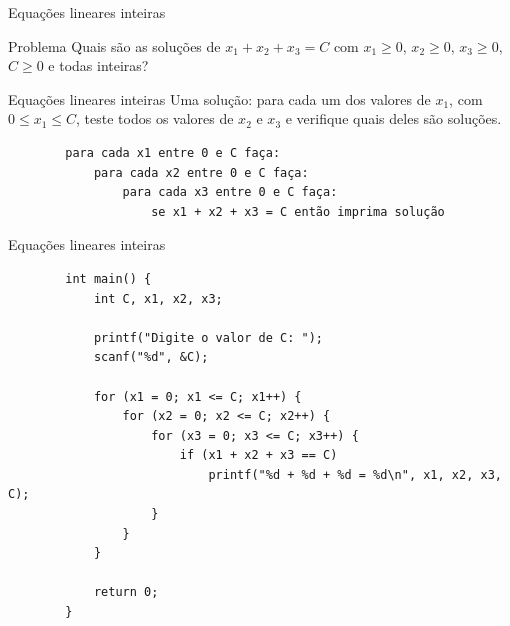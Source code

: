 \documentclass[handout]{beamer}
\begin{document}
\begin{frame}[fragile]{Equações lineares inteiras}
    \begin{block}{Problema}
        Quais são as soluções de $x_1 + x_2 + x_3 = C$ com $x_1 \geq 0$, $x_2 \geq 0$, $x_3 \geq 0$, $C \geq 0$ e todas inteiras?
    \end{block}
\end{frame}

\begin{frame}[fragile]{Equações lineares inteiras}
    Uma solução: para cada um dos valores de $x_1$, com $0 \le x_1 \le C$, teste todos os valores de $x_2$ e $x_3$ e verifique quais deles são soluções.

    \begin{verbatim}
        para cada x1 entre 0 e C faça:
            para cada x2 entre 0 e C faça:
                para cada x3 entre 0 e C faça:
                    se x1 + x2 + x3 = C então imprima solução
    \end{verbatim}
\end{frame}

\begin{frame}[fragile]{Equações lineares inteiras}

    \begin{verbatim}
        int main() {
            int C, x1, x2, x3;

            printf("Digite o valor de C: ");
            scanf("%d", &C);

            for (x1 = 0; x1 <= C; x1++) {
                for (x2 = 0; x2 <= C; x2++) {
                    for (x3 = 0; x3 <= C; x3++) {
                        if (x1 + x2 + x3 == C)
                            printf("%d + %d + %d = %d\n", x1, x2, x3, C);
                    }
                }
            }

            return 0;
        }
    \end{verbatim}
\end{frame}
\end{document}
